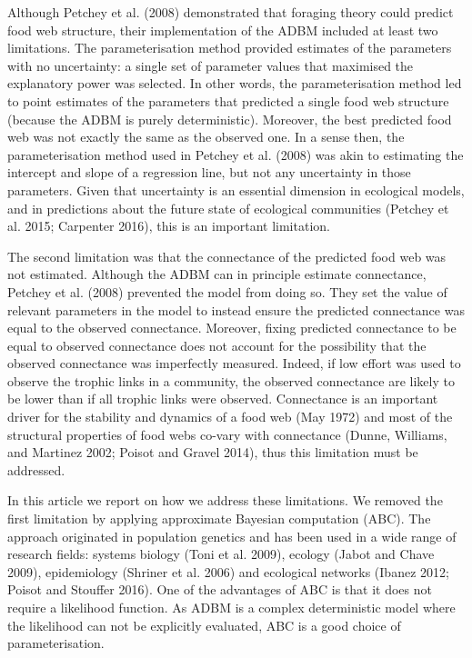 \documentclass{article}
\begin{document}
Although Petchey et al. (2008) demonstrated that foraging theory could
predict food web structure, their implementation of the ADBM included at
least two limitations. The parameterisation method provided estimates of
the parameters with no uncertainty: a single set of parameter values
that maximised the explanatory power was selected. In other words, the
parameterisation method led to point estimates of the parameters that
predicted a single food web structure (because the ADBM is purely
deterministic). Moreover, the best predicted food web was not exactly
the same as the observed one. In a sense then, the parameterisation
method used in Petchey et al. (2008) was akin to estimating the
intercept and slope of a regression line, but not any uncertainty in
those parameters. Given that uncertainty is an essential dimension in
ecological models, and in predictions about the future state of
ecological communities (Petchey et al. 2015; Carpenter 2016), this is an
important limitation.

The second limitation was that the connectance of the predicted food web
was not estimated. Although the ADBM can in principle estimate
connectance, Petchey et al. (2008) prevented the model from doing so.
They set the value of relevant parameters in the model to instead ensure
the predicted connectance was equal to the observed connectance.
Moreover, fixing predicted connectance to be equal to observed
connectance does not account for the possibility that the observed
connectance was imperfectly measured. Indeed, if low effort was used to
observe the trophic links in a community, the observed connectance are
likely to be lower than if all trophic links were observed. Connectance
is an important driver for the stability and dynamics of a food web (May
1972) and most of the structural properties of food webs co-vary with
connectance (Dunne, Williams, and Martinez 2002; Poisot and Gravel
2014), thus this limitation must be addressed.

In this article we report on how we address these limitations. We
removed the first limitation by applying approximate Bayesian
computation (ABC). The approach originated in population genetics and
has been used in a wide range of research fields: systems biology (Toni
et al. 2009), ecology (Jabot and Chave 2009), epidemiology (Shriner et
al. 2006) and ecological networks (Ibanez 2012; Poisot and Stouffer
2016). One of the advantages of ABC is that it does not require a
likelihood function. As ADBM is a complex deterministic model where the
likelihood can not be explicitly evaluated, ABC is a good choice of
parameterisation.
\end{document}

